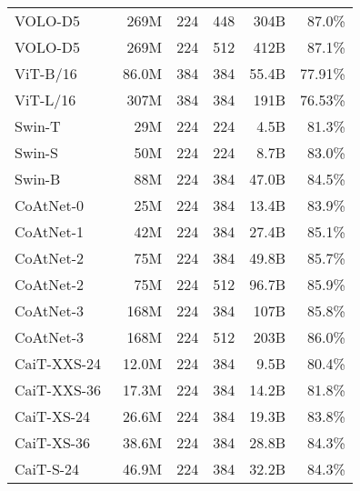 \documentclass{article}
\begin{document}
\begin{table*}
{\begin{tabular}{lrrrrr}
        VOLO-D5~ \cite{yuan2021volo}                      &   269M &       224 & 448 &  304B & 87.0\%  \\
        VOLO-D5~ \cite{yuan2021volo}                      &   269M &       224 & 512 &  412B & 87.1\%  \\ \midrule
        ViT-B/16~\cite{dosovitskiy2020image}              &  86.0M &       384 & 384 & 55.4B & 77.91\% \\
        ViT-L/16~\cite{dosovitskiy2020image}              &   307M &       384 & 384 &  191B & 76.53\% \\ \midrule
        Swin-T~\cite{liu2021swin}                         &    29M &       224 & 224 &  4.5B & 81.3\%  \\
        Swin-S~\cite{liu2021swin}                         &    50M &       224 & 224 &  8.7B & 83.0\%  \\
        Swin-B~\cite{liu2021swin}                         &    88M &       224 & 384 & 47.0B & 84.5\%  \\ \midrule
        CoAtNet-0~\cite{dia2021coatnet}                   &    25M &       224 & 384 & 13.4B & 83.9\%  \\
        CoAtNet-1~\cite{dia2021coatnet}                   &    42M &       224 & 384 & 27.4B & 85.1\%  \\
        CoAtNet-2~\cite{dia2021coatnet}                   &    75M &       224 & 384 & 49.8B & 85.7\%  \\
        CoAtNet-2~\cite{dia2021coatnet}                   &    75M &       224 & 512 & 96.7B & 85.9\%  \\
        CoAtNet-3~\cite{dia2021coatnet}                   &   168M &       224 & 384 &  107B & 85.8\%  \\
        CoAtNet-3~\cite{dia2021coatnet}                   &   168M &       224 & 512 &  203B & 86.0\%  \\ \midrule
        CaiT-XXS-24~\cite{touvron2021going}               &  12.0M &       224 & 384 &  9.5B & 80.4\%  \\
        CaiT-XXS-36~\cite{touvron2021going}               &  17.3M &       224 & 384 & 14.2B & 81.8\%  \\
        CaiT-XS-24~\cite{touvron2021going}                &  26.6M &       224 & 384 & 19.3B & 83.8\%  \\
        CaiT-XS-36~\cite{touvron2021going}                &  38.6M &       224 & 384 & 28.8B & 84.3\%  \\
        CaiT-S-24~\cite{touvron2021going}                 &  46.9M &       224 & 384 & 32.2B & 84.3\%  \\

\end{tabular}}
\end{table*}
\end{document}
